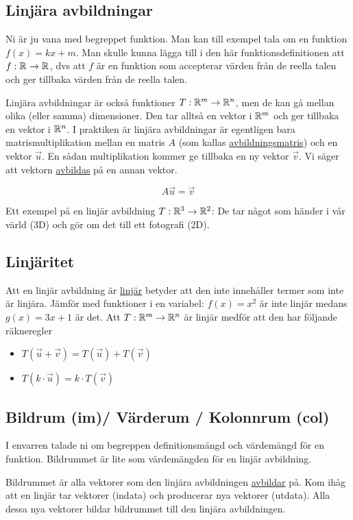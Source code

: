 \documentclass[../main.tex]{subfiles}
\begin{document}
\subsection{Linjära avbildningar}
Ni är ju vana med begreppet funktion. Man kan till exempel tala om en funktion $f(x) = kx + m$. Man skulle kunna lägga till i den här funktionsdefinitionen att $f:\mathbb{R}^{} \rightarrow \mathbb{R}^{}$, dvs att $f$ är en funktion som accepterar värden från de reella talen och ger tillbaka värden från de reella talen.

Linjära avbildningar är också funktioner $T: \mathbb{R}^{m} \rightarrow \mathbb{R}^{n}$, men de kan gå mellan olika (eller samma) dimensioner. Den tar alltså en vektor i $\mathbb{R}^{m}$ och ger tillbaka en vektor i $\mathbb{R}^{n}$. I praktiken är linjära avbildningar är egentligen bara matrismultiplikation mellan en matris $A$ (som kallas \underline{avbildningsmatris}) och en vektor $\Vec{u}$. En sådan multiplikation kommer ge tillbaka en ny vektor $\Vec{v}$. Vi säger att vektorn \underline{avbildas} på en annan vektor.

$$A\Vec{u} = \Vec{v}$$

Ett exempel på en linjär avbildning $T: \mathbb{R}^{3} \rightarrow \mathbb{R}^{2}$: De tar något som händer i vår värld (3D) och gör om det till ett fotografi (2D).

\subsection{Linjäritet}
Att en linjär avbildning är \underline{linjär} betyder att den inte innehåller termer som inte är linjära. Jämför med funktioner i en variabel: $f(x) = x^2$ är inte linjär medans $g(x) = 3x +1$ är det. Att $T: \mathbb{R}^{m} \rightarrow \mathbb{R}^{n}$ är linjär medför att den har följande räkneregler
\begin{itemize}
    \item $T(\Vec{u} + \Vec{v}) = T(\Vec{u}) + T(\Vec{v})$
    \item $T(k\cdot \Vec{u}) = k\cdot T(\Vec{v})$
\end{itemize}

\subsection{Bildrum (im)/ Värderum / Kolonnrum (col)}
I envarren talade ni om begreppen definitionsmängd och värdemängd för en funktion. Bildrummet är lite som värdemängden för en linjär avbildning.

Bildrummet är alla vektorer som den linjära avbildningen \underline{avbildar} på. Kom ihåg att en linjär tar vektorer (indata) och producerar nya vektorer (utdata). Alla dessa nya vektorer bildar bildrummet till den linjära avbildningen.
\end{document}
